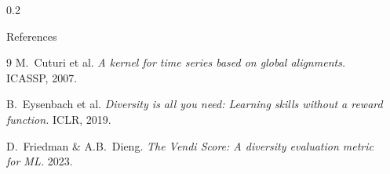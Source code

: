 \documentclass[final]{beamer}
\newlength{\sepwidth}
\newcommand{\separatorcolumn}{\begin{column}{\sepwidth}\end{column}}
\begin{document}
\begin{frame}[t]
\begin{columns}[t]
\begin{column}{0.2\paperwidth}
\begin{block}{References}
\begin{thebibliography}{9}
        M.~Cuturi et al. \textit{A kernel for time series based on global alignments.} ICASSP, 2007.

        B.~Eysenbach et al. \textit{Diversity is all you need: Learning skills without a reward function.} ICLR, 2019.

        D.~Friedman \& A.B.~Dieng. \textit{The Vendi Score: A diversity evaluation metric for ML.} 2023.
    \end{thebibliography}
\end{block}
\endgroup

  \end{column}

  \separatorcolumn
\end{columns}

\end{frame}
\end{document}
